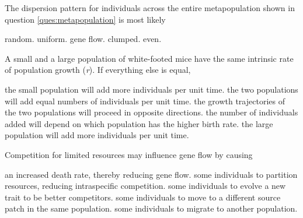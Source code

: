 \question
The dispersion pattern for individuals across the entire metapopulation shown in question \ref{ques:metapopulation} is most likely

\begin{choices}
\choice random. 
\choice uniform. 
\choice gene flow. 
\correctchoice clumped. 
\choice even. 
\end{choices}

\question
A small and a large population of white-footed mice have the same intrinsic rate of population growth (\textit{r}).  If everything else is equal, 

\begin{choices}
\choice the small population will add more individuals per unit time. 
\choice the two populations will add equal numbers of individuals per unit time.
\choice the growth trajectories of the two populations will proceed in opposite directions. 
\choice the number of individuals added will depend on which population has the higher birth rate. 
\correctchoice the large population will add more individuals per unit time.  
\end{choices}

\question
Competition for limited resources may influence gene flow by causing

\begin{choices}
\choice  an increased death rate, thereby reducing gene flow.
\choice  some individuals to partition resources, reducing intraspecific competition.
\choice  some individuals to evolve a new trait to be better competitors.
\choice  some individuals to move to a different source patch in the same population.
\correctchoice some individuals to migrate to another population.
\end{choices}
